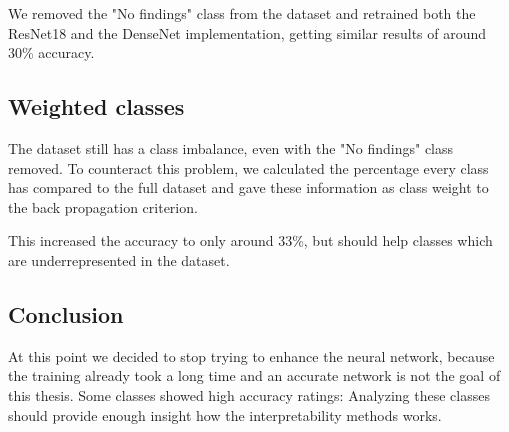 We removed the "No findings" class from the dataset and retrained both the ResNet18 and the DenseNet implementation, getting similar results of around 30\% accuracy.

\subsection{Weighted classes}
The dataset still has a class imbalance, even with the "No findings" class removed. To counteract this problem, we calculated the percentage every class has compared to the full dataset and gave these information as class weight to the back propagation criterion.

This increased the accuracy to only around 33\%, but should help classes which are underrepresented in the dataset.

\subsection{Conclusion}
At this point we decided to stop trying to enhance the neural network, because the training already took a long time and an accurate network is not the goal of this thesis. Some classes showed high accuracy ratings: Analyzing these classes should provide enough insight how the interpretability methods works.
